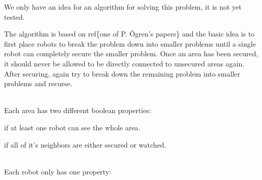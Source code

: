 We only have an idea for an algorithm for solving this problem, it is not yet tested.

The algorithm is based on ref\{one of P. Ögren's papers\} and the basic idea is to first place robots to break the problem down into smaller problems until a single robot can completely secure the smaller problem.
Once an area has been secured, it should never be allowed to be directly connected to unsecured areas again.
After securing, again try to break down the remaining problem into smaller problems and recurse.

\ \\
Each area has two different boolean properties:
\begin{definition}[Watched]
if at least one robot can see the whole area.
\end{definition}
\begin{definition}[Secured]
if all of it's neighbors are either secured or watched.
\end{definition}
\\
Each robot only has one property:

